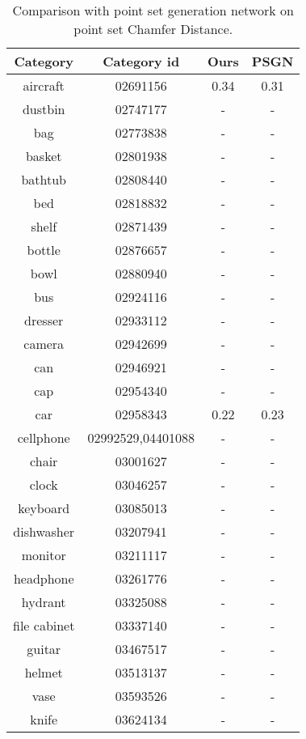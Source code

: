 \begin{table*}
	\centering
	\caption{Comparison with point set generation network on point set Chamfer Distance. }
	\begin{tabular}{c c c c}
		Category & Category id & Ours & PSGN\cite{PSGN} \\
		\hline
		aircraft & 02691156 & 0.34 & 0.31\\   
		dustbin & 02747177 &- & -\\
		bag & 02773838  &- &  -\\
		basket & 02801938 &- & -\\
		bathtub & 02808440 &- & -\\
		bed & 02818832 & - & -\\
		shelf & 02871439 &- & -\\
		bottle & 02876657 &- & -\\
		bowl & 02880940 &- & -\\
		bus & 02924116 &- & -\\
		dresser & 02933112 &- & -\\
		camera & 02942699 &- & -\\
		can & 02946921 &- & -\\
		cap & 02954340 &- & -\\
		car & 02958343 & 0.22 & 0.23\\
		cellphone & 02992529,04401088 & - & -\\
		chair & 03001627 & - & -\\
		clock & 03046257 & - & -\\
		keyboard & 03085013 & - & -\\
		dishwasher & 03207941 & - & -\\
		monitor & 03211117 & - & -\\
		headphone & 03261776 & - & -\\
		hydrant & 03325088 & - & -\\
		file cabinet& 03337140 & - & -\\
		guitar & 03467517 & - & -\\
		helmet & 03513137 & - & -\\
		vase & 03593526 & -& -\\
		knife & 03624134 & - &-\\

\end{tabular}
\end{table*}
